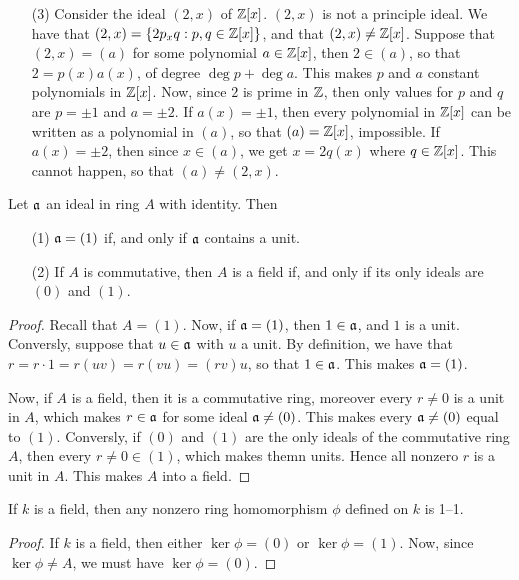 \begin{example}
\begin{enumerate}
         \item[(3)] Consider the ideal $(2,x)$ of $\mathbb{Z}[x]$. $(2,x)$ is not a
             principle ideal. We have that $(2,x)=\{2p_xq : p,q \in \mathbb{Z}[x]\}$,
             and that $(2,x) \neq \mathbb{Z}[x]$. Suppose that $(2,x)=(a)$ for some
             polynomial $a \in \mathbb{Z}[x]$, then $2 \in (a)$, so that $2=p(x)a(x)$,
             of degree $\deg{p}+\deg{a}$. This makes $p$ and $a$ constant
             polynomials in $\mathbb{Z}[x]$. Now, since $2$ is prime in $\mathbb{Z}$, then only
             values for $p$ and  $q$ are  $p=\pm1$ and $a=\pm2$. If $a(x)=\pm1$,
             then every polynomial in $\mathbb{Z}[x]$ can be written as a polynomial in
             $(a)$, so that $(a)=\mathbb{Z}[x]$, impossible. If $a(x)=\pm2$, then since
             $x \in (a)$, we get $x=2q(x)$ where $q \in \mathbb{Z}[x]$. This cannot
             happen, so that $(a) \neq (2,x)$.
    \end{enumerate}
\end{example}

\begin{lemma}\label{1.4.1}
    Let $\mathfrak{a}$ an ideal in ring $A$ with identity. Then
    \begin{enumerate}
        \item[(1)] $\mathfrak{a}=(1)$ if, and only if $\mathfrak{a}$ contains a unit.

        \item[(2)] If $A$ is commutative, then $A$ is a field if, and only if
            its only ideals are $(0)$ and $(1)$.
    \end{enumerate}
\end{lemma}
\begin{proof}
    Recall that $A=(1)$. Now, if $\mathfrak{a}=(1)$, then $1 \in \mathfrak{a}$, and  $1$ is a unit.
    Conversly, suppose that $u \in \mathfrak{a}$ with $u$ a unit. By definition, we have
    that  $r=r \cdot 1=r(uv)=r(vu)=(rv)u$, so that $1 \in \mathfrak{a}$. This makes
    $\mathfrak{a}=(1)$.

    Now, if $A$ is a field, then it is a commutative ring, moreover every  $r
    \neq 0$ is a unit in $A$, which makes $r \in \mathfrak{a}$ for some ideal $\mathfrak{a} \neq
    (0)$. This makes every $\mathfrak{a} \neq (0)$ equal to $(1)$. Conversly, if $(0)$ and
    $(1)$ are the only ideals of the commutative ring $A$, then every $r \neq 0
    \in (1)$, which makes themn units. Hence all nonzero $r$ is a unit in $A$.
    This makes $A$ into a field.
\end{proof}
\begin{corollary}
    If $k$ is a field, then any nonzero ring homomorphism $\phi$ defined on $k$
    is 1--1.
\end{corollary}
\begin{proof}
    If $k$ is a field, then either $\ker{\phi}=(0)$ or $\ker{\phi}=(1)$. Now,
    since $\ker{\phi} \neq A$, we must have $\ker{\phi}=(0)$.
\end{proof}

